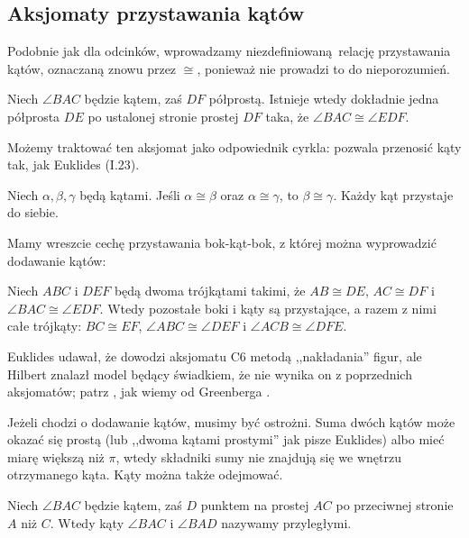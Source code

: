 \subsection{Aksjomaty przystawania kątów}
Podobnie jak dla odcinków, wprowadzamy niezdefiniowaną relację przystawania kątów, oznaczaną znowu przez $\cong$, ponieważ nie prowadzi to do nieporozumień.

\begin{axiom}[przystawania, C4]
    Niech $\angle BAC$ będzie kątem, zaś $DF$ półprostą.
    Istnieje wtedy dokładnie jedna półprosta $DE$ po ustalonej stronie prostej $DF$ taka, że $\angle BAC \cong \angle EDF$.
\end{axiom}

Możemy traktować ten aksjomat jako odpowiednik cyrkla: pozwala przenosić kąty tak, jak Euklides (I.23).

\begin{axiom}[przystawania, C5]
    Niech $\alpha, \beta, \gamma$ będą kątami.
    Jeśli $\alpha \cong \beta$ oraz $\alpha \cong \gamma$, to $\beta \cong \gamma$.
    Każdy kąt przystaje do siebie.
\end{axiom}

Mamy wreszcie cechę przystawania bok-kąt-bok, z której można wyprowadzić dodawanie kątów:

\begin{axiom}[przystawania, C6]
    Niech $ABC$ i $DEF$ będą dwoma trójkątami takimi, że $AB \cong DE$, $AC \cong DF$ i $\angle BAC \cong \angle EDF$.
    Wtedy pozostałe boki i kąty są przystające, a razem z nimi całe trójkąty: $BC \cong EF$, $\angle ABC \cong \angle DEF$ i $\angle ACB \cong \angle DFE$.
\end{axiom}

Euklides udawał, że dowodzi aksjomatu C6 metodą ,,nakładania'' figur, ale Hilbert znalazł model będący świadkiem, że nie wynika on z poprzednich aksjomatów; patrz \cite[paragraf 11]{hilbert_1988}, jak wiemy od Greenberga \cite[s. 200]{greenberg_2010}.

Jeżeli chodzi o dodawanie kątów, musimy być ostrożni.
Suma dwóch kątów może okazać się prostą (lub ,,dwoma kątami prostymi'' jak pisze Euklides) albo mieć miarę większą niż $\pi$, wtedy składniki sumy nie znajdują się we wnętrzu otrzymanego kąta.
Kąty można także odejmować.

\begin{definition}
    Niech $\angle BAC$ będzie kątem, zaś $D$ punktem na prostej $AC$ po przeciwnej stronie $A$ niż $C$.
    Wtedy kąty $\angle BAC$ i $\angle BAD$ nazywamy przyległymi. %
\end{definition}

